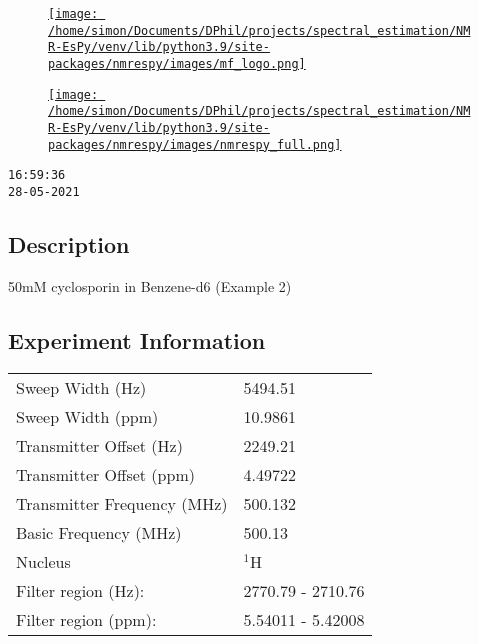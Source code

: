 \documentclass[8pt]{article}
\begin{document}
\begin{figure}[!ht]
\begin{minipage}[b][2.5cm][c]{.72\textwidth}
\href{http://foroozandeh.chem.ox.ac.uk/home}%
{\texttt{[image: /home/simon/Documents/DPhil/projects/spectral\_estimation/NMR-EsPy/venv/lib/python3.9/site-packages/nmrespy/images/mf\_logo.png]}}
\end{minipage}
\begin{minipage}[b][2.5cm][c]{.27\textwidth}
\href{https://nmr-espy.readthedocs.io/en/1.0.0rc1/}%
{\texttt{[image: /home/simon/Documents/DPhil/projects/spectral\_estimation/NMR-EsPy/venv/lib/python3.9/site-packages/nmrespy/images/nmrespy\_full.png]}}
\end{minipage}
\end{figure}

\texttt{16:59:36\\28-05-2021}

\subsection*{Description}
50mM cyclosporin in Benzene-d6 (Example 2)

\subsection*{Experiment Information}
\hspace{-6pt}
\begin{tabular}{ll}
Sweep Width (Hz) & 5494.51 \\
Sweep Width (ppm) & 10.9861 \\
Transmitter Offset (Hz) & 2249.21 \\
Transmitter Offset (ppm) & 4.49722 \\
Transmitter Frequency (MHz) & 500.132 \\
Basic Frequency (MHz) & 500.13 \\
Nucleus & $^{1}$H \\
Filter region (Hz): & 2770.79 - 2710.76 \\
Filter region (ppm): & 5.54011 - 5.42008 \\

\end{tabular}
\end{document}

